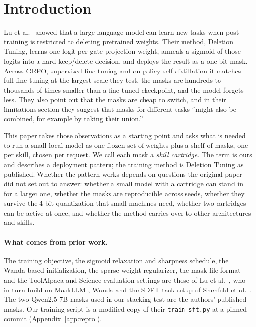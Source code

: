 \documentclass[11pt]{article}
\begin{document}
\section{Introduction}

Lu et al.\ \citep{lu2026deleting} showed that a large language model can learn new tasks when post-training is restricted to deleting pretrained weights. Their method, Deletion Tuning, learns one logit per gate-projection weight, anneals a sigmoid of those logits into a hard keep/delete decision, and deploys the result as a one-bit mask. Across GRPO, supervised fine-tuning and on-policy self-distillation it matches full fine-tuning at the largest scale they test, the masks are hundreds to thousands of times smaller than a fine-tuned checkpoint, and the model forgets less. They also point out that the masks are cheap to switch, and in their limitations section they suggest that masks for different tasks ``might also be combined, for example by taking their union.''

This paper takes those observations as a starting point and asks what is needed to run a small local model as one frozen set of weights plus a shelf of masks, one per skill, chosen per request. We call each mask a \emph{skill cartridge}. The term is ours and describes a deployment pattern; the training method is Deletion Tuning as published. Whether the pattern works depends on questions the original paper did not set out to answer: whether a small model with a cartridge can stand in for a larger one, whether the masks are reproducible across seeds, whether they survive the 4-bit quantization that small machines need, whether two cartridges can be active at once, and whether the method carries over to other architectures and skills.

\paragraph{What comes from prior work.} The training objective, the sigmoid relaxation and sharpness schedule, the Wanda-based initialization, the sparse-weight regularizer, the mask file format and the ToolAlpaca and Science evaluation settings are those of Lu et al.\ \citep{lu2026deleting}, who in turn build on MaskLLM \citep{fang2024maskllm}, Wanda \citep{sun2023wanda} and the SDFT task setup of Shenfeld et al.\ \citep{shenfeld2026sdft}. The two Qwen2.5-7B masks used in our stacking test are the authors' published masks. Our training script is a modified copy of their \texttt{train\_sft.py} at a pinned commit (Appendix~\ref{app:repro}).
\end{document}
